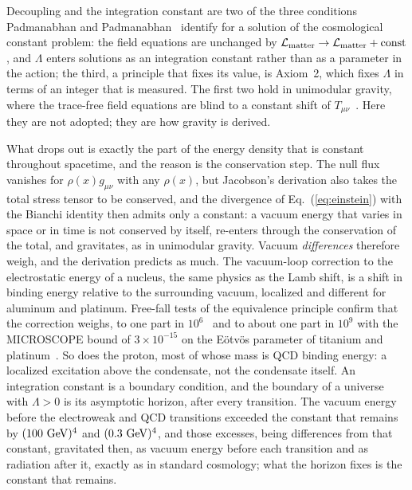 \documentclass[aps,prd,twocolumn,superscriptaddress,nofootinbib,showkeys]{revtex4-2}
\begin{document}
Decoupling and the integration constant are two of the three conditions Padmanabhan and Padmanabhan~\cite{padmanabhan2014} identify for a solution of the cosmological constant problem: the field equations are unchanged by $\mathcal{L}_{\rm matter}\to \mathcal{L}_{\rm matter}+{\rm const}$, and $\Lambda$ enters solutions as an integration constant rather than as a parameter in the action; the third, a principle that fixes its value, is Axiom~2, which fixes $\Lambda$ in terms of an integer that is measured. The first two hold in unimodular gravity, where the trace-free field equations are blind to a constant shift of $T_{\mu\nu}$~\cite{ellis2011,bonder2018}. Here they are not adopted; they are how gravity is derived.

What drops out is exactly the part of the energy density that is constant throughout spacetime, and the reason is the conservation step. The null flux vanishes for $\rho(x)g_{\mu\nu}$ with any $\rho(x)$, but Jacobson's derivation also takes the total stress tensor to be conserved, and the divergence of Eq.~(\ref{eq:einstein}) with the Bianchi identity then admits only a constant: a vacuum energy that varies in space or in time is not conserved by itself, re-enters through the conservation of the total, and gravitates, as in unimodular gravity. Vacuum \emph{differences} therefore weigh, and the derivation predicts as much. The vacuum-loop correction to the electrostatic energy of a nucleus, the same physics as the Lamb shift, is a shift in binding energy relative to the surrounding vacuum, localized and different for aluminum and platinum. Free-fall tests of the equivalence principle confirm that the correction weighs, to one part in $10^6$~\cite{polchinski2006,bousso2008} and to about one part in $10^9$ with the MICROSCOPE bound of $3\times10^{-15}$ on the E\"otv\"os parameter of titanium and platinum~\cite{touboul2022}. So does the proton, most of whose mass is QCD binding energy: a localized excitation above the condensate, not the condensate itself. An integration constant is a boundary condition, and the boundary of a universe with $\Lambda>0$ is its asymptotic horizon, after every transition. The vacuum energy before the electroweak and QCD transitions exceeded the constant that remains by $(100~{\rm GeV})^4$ and $(0.3~{\rm GeV})^4$, and those excesses, being differences from that constant, gravitated then, as vacuum energy before each transition and as radiation after it, exactly as in standard cosmology; what the horizon fixes is the constant that remains.
\end{document}
